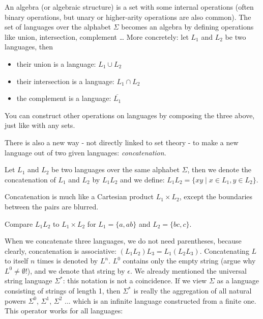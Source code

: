 An algebra (or algebraic structure) is a set with some internal
operations (often binary operations, but unary or higher-arity operations are also
common). The set of languages
over the alphabet $\Sigma$ becomes an algebra by defining operations
like union, intersection, complement \ldots{} More concretely:
let $L_1$ and $L_2$ be two languages, then

\begin{itemize}
\item their union is a language: $L_1 \cup L_2$
\item their intersection is a language: $L_1 \cap L_2$
\item the complement is a language: $\overline{L_1}$
\end{itemize}

You can construct other operations on languages by composing the three
above, just like with any sets.

There is also a new way - not directly linked to set theory - to make
a new language out of two given languages: {\em concatenation}.

\begin{definition}
Let $L_1$ and $L_2$ be two languages over the same alphabet $\Sigma$,
then we denote the concatenation of $L_1$ and $L_2$ by $L_1L_2$ and we
define: $L_1L_2 = \{xy \mid x \in L_1, y \in L_2\}$.
\end{definition}

Concatenation is much like a Cartesian product $L_1\times L_2$, except the boundaries between the pairs are blurred.

\begin{exercise}
Compare $L_1L_2$ to $L_1\times L_2$ for $L_1 = \{a,ab\}$ and $L_2 = \{bc,c\}$.
\end{exercise}

When we concatenate three languages, we do not need parentheses, because
clearly, concatenation is associative: $(L_1L_2)L_3 = L_1(L_2L_3)$.
Concatenating $L$ to itself $n$ times is denoted by $L^n$.
$L^0$ contains only the empty string (argue why $L^0\neq \emptyset$!), and we denote that string by $\epsilon$. We already mentioned the universal string language $\Sigma^*$: this notation is not a coincidence. If we view $\Sigma$ as a language consisting of strings of length 1, then $\Sigma^*$ is really the aggregation of all natural powers $\Sigma^0$, $\Sigma^1$, $\Sigma^2$ ... which is an infinite language constructed from a finite one. This operator works for all languages:

